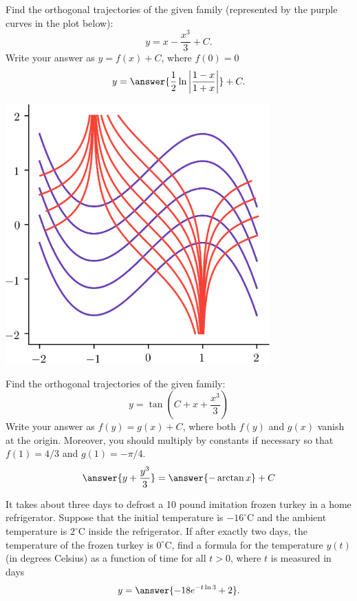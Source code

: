 \documentclass{ximera}
\begin{document}
\begin{exercise}
Find the orthogonal trajectories of the given family (represented by the purple curves in the plot below):
\[ y = x - \frac{x^3}{3} + C. \]
Write your answer as $y = f(x) + C$, where $f(0) = 0$
\[ y = \answer{\frac{1}{2} \ln \left| \frac{1-x}{1+x} \right|} + C. \]
\begin{center}
\begin{image}
\includegraphics[width=4in]{images/ortho02.png}
\end{image}
\end{center}

\end{exercise}

\begin{exercise}
Find the orthogonal trajectories of the given family:
\[ y = \tan \left( C + x + \frac{x^3}{3} \right) \]
Write your answer as $f(y) = g(x) + C$, where both $f(y)$ and $g(x)$ vanish at the origin. Moreover, you should multiply by constants if necessary so that $f(1) = 4/3$ and $g(1) = -\pi/4$.
\[ \answer{y + \frac{y^3}{3}} = \answer{- \arctan x} + C \]
\end{exercise}



\begin{exercise}
It takes about three days to defrost a 10 pound imitation frozen turkey in a home refrigerator. Suppose that the initial temperature is $-16^\circ$C and the ambient temperature is $2^\circ$C inside the refrigerator. If after exactly two days, the temperature of the frozen turkey is $0^\circ$C, find a formula for the temperature $y(t)$ (in degrees Celsius) as a function of time for all $t > 0$, where $t$ is measured in days
\[ y = \answer{ -18 e^{-t \ln 3} + 2}. \]
\end{exercise}
\end{document}
